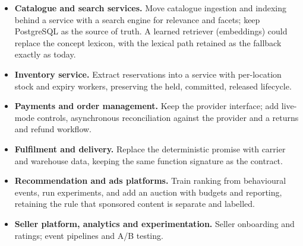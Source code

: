 \begin{itemize}
\item \textbf{Catalogue and search services.} Move catalogue ingestion and indexing behind a service with a search engine for relevance and facets; keep PostgreSQL as the source of truth. A learned retriever (embeddings) could replace the concept lexicon, with the lexical path retained as the fallback exactly as today.
\item \textbf{Inventory service.} Extract reservations into a service with per-location stock and expiry workers, preserving the held, committed, released lifecycle.
\item \textbf{Payments and order management.} Keep the provider interface; add live-mode controls, asynchronous reconciliation against the provider and a returns and refund workflow.
\item \textbf{Fulfilment and delivery.} Replace the deterministic promise with carrier and warehouse data, keeping the same function signature as the contract.
\item \textbf{Recommendation and ads platforms.} Train ranking from behavioural events, run experiments, and add an auction with budgets and reporting, retaining the rule that sponsored content is separate and labelled.
\item \textbf{Seller platform, analytics and experimentation.} Seller onboarding and ratings; event pipelines and A/B testing.
\end{itemize}
